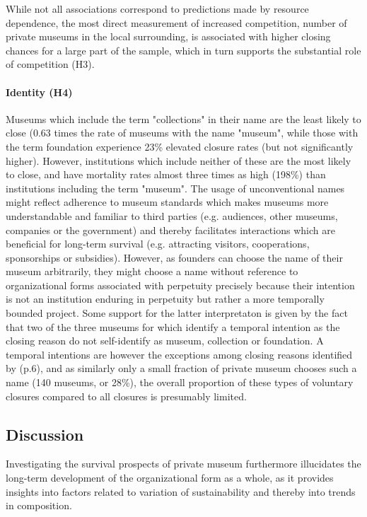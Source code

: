 \documentclass[12pt]{article}
\begin{document}
While not all associations correspond to predictions made by resource dependence, the most direct measurement of increased competition, number of private museums in the local surrounding, is associated with higher closing chances for a large part of the sample, which in turn supports the substantial role of competition (H3).
\paragraph*{Identity (H4)}


Museums which include the term "collections" in their name are the least likely to close (0.63 times the rate of museums with the name "museum", while those with the term foundation experience 23\% elevated closure rates (but not significantly higher).
However, institutions which include neither of these are the most likely to close, and have mortality rates almost three times as high (198\%) than institutions including the term "museum".
The usage of unconventional names might reflect adherence to museum standards which makes museums more understandable and familiar to third parties (e.g. audiences, other museums, companies or the government) and thereby facilitates interactions which are beneficial for long-term survival (e.g. attracting visitors, cooperations, sponsorships or subsidies).
However, as founders can choose the name of their museum arbitrarily, they might choose a name without reference to organizational forms associated with perpetuity precisely because their intention is not an institution enduring in perpetuity but rather a more temporally bounded project.
Some support for the latter interpretaton is given by the fact that two of the three museums for which \textcite{Velthuis_Gera_2024_fragility} identify a temporal intention as the closing reason do not self-identify as museum, collection or foundation.
A temporal intentions are however the exceptions among closing reasons identified by \textcite{Velthuis_Gera_2024_fragility} (p.6), and as similarly only a small fraction of private museum chooses such a name (140 museums, or 28\%), the overall proportion of these types of voluntary closures compared to all closures is presumably limited.
\subsection*{Discussion}



Investigating the survival prospects of private museum furthermore illucidates the long-term development of the organizational form as a whole, as it provides insights into factors related to variation of sustainability and thereby into trends in composition. 
\end{document}
